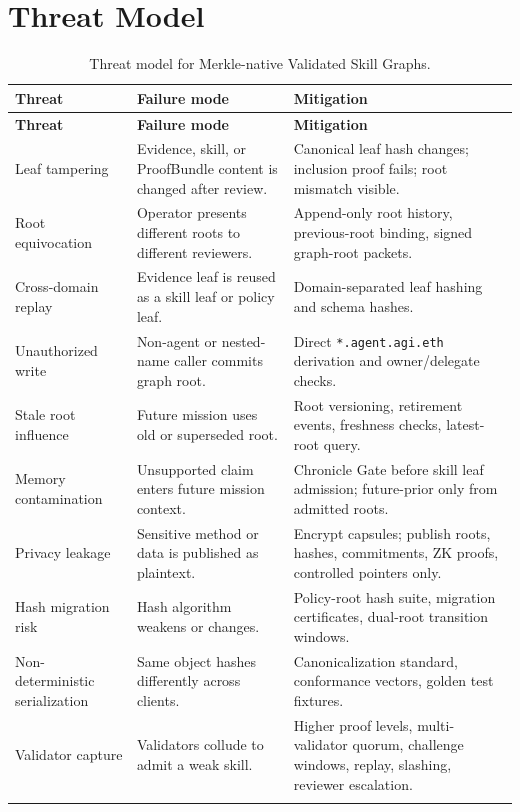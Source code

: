 \documentclass[11pt,letterpaper]{article}
\begin{document}
\section{Threat Model}
\begin{longtable}{p{1.55in}p{2.2in}p{2.35in}}
\toprule
\textbf{Threat} & \textbf{Failure mode} & \textbf{Mitigation}\\
\midrule
\endfirsthead
\toprule
\textbf{Threat} & \textbf{Failure mode} & \textbf{Mitigation}\\
\midrule
\endhead
Leaf tampering & Evidence, skill, or ProofBundle content is changed after review. & Canonical leaf hash changes; inclusion proof fails; root mismatch visible.\\
Root equivocation & Operator presents different roots to different reviewers. & Append-only root history, previous-root binding, signed graph-root packets.\\
Cross-domain replay & Evidence leaf is reused as a skill leaf or policy leaf. & Domain-separated leaf hashing and schema hashes.\\
Unauthorized write & Non-agent or nested-name caller commits graph root. & Direct \texttt{*.agent.agi.eth} derivation and owner/delegate checks.\\
Stale root influence & Future mission uses old or superseded root. & Root versioning, retirement events, freshness checks, latest-root query.\\
Memory contamination & Unsupported claim enters future mission context. & Chronicle Gate before skill leaf admission; future-prior only from admitted roots.\\
Privacy leakage & Sensitive method or data is published as plaintext. & Encrypt capsules; publish roots, hashes, commitments, ZK proofs, controlled pointers only.\\
Hash migration risk & Hash algorithm weakens or changes. & Policy-root hash suite, migration certificates, dual-root transition windows.\\
Non-deterministic serialization & Same object hashes differently across clients. & Canonicalization standard, conformance vectors, golden test fixtures.\\
Validator capture & Validators collude to admit a weak skill. & Higher proof levels, multi-validator quorum, challenge windows, replay, slashing, reviewer escalation.\\
\bottomrule
\caption{Threat model for Merkle-native Validated Skill Graphs.}
\end{longtable}
\end{document}
